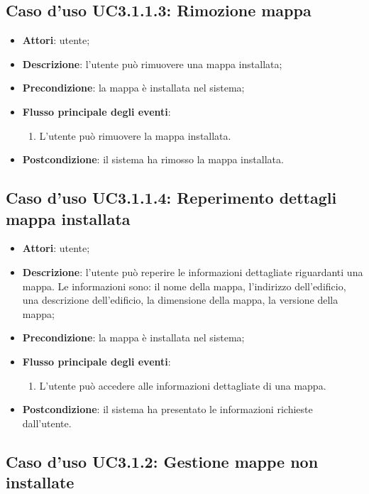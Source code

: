 \documentclass[../AnalisiDeiRequisiti.tex]{subfiles}
\begin{document}
\subsection{Caso d'uso UC3.1.1.3: Rimozione mappa}
\begin{itemize}
	\item \textbf{Attori}: utente;
	\item \textbf{Descrizione}: l'utente può rimuovere una mappa installata; 
	\item \textbf{Precondizione}: la mappa è installata nel sistema;
	
	\item \textbf{Flusso principale degli eventi}:
	\begin{enumerate}
		\item L'utente può rimuovere la mappa installata.
		
	\end{enumerate}
	\item \textbf{Postcondizione}: il sistema ha rimosso la mappa installata.
\end{itemize}
\hypertarget{UC3.1.1.4}{}
\subsection{Caso d'uso UC3.1.1.4: Reperimento dettagli mappa installata}
\begin{itemize}
	\item \textbf{Attori}: utente;
	\item \textbf{Descrizione}: l'utente può reperire le informazioni dettagliate riguardanti una mappa. Le informazioni sono: il nome della mappa, l'indirizzo dell'edificio, una descrizione dell'edificio, la dimensione della mappa, la versione della mappa; 
	\item \textbf{Precondizione}: la mappa è installata nel sistema;
	
	\item \textbf{Flusso principale degli eventi}:
	\begin{enumerate}
		\item L'utente può accedere alle informazioni dettagliate di una mappa.
		
	\end{enumerate}
	\item \textbf{Postcondizione}: il sistema ha presentato le informazioni richieste dall'utente.
\end{itemize}
\hypertarget{UC3.1.2}{}
\subsection{Caso d'uso UC3.1.2: Gestione mappe non installate}
\end{document}
